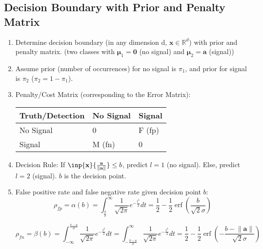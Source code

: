 \documentclass[11pt]{article}
\newcommand{\R}{\mathbb{R}}
\newcommand{\norm}[1]{\left\lVert#1\right\rVert}
\DeclareMathOperator{\erf}{erf}
\begin{document}
\subsection{Decision Boundary with Prior and Penalty Matrix}

\begin{enumerate}
    \item Determine decision boundary (in any dimension d, $\mathbf{x} \in \R^d$) with prior and penalty matrix. (two classes with $\mathbf{\mu}_1 = \mathbf{0}$ (no signal) and $\mathbf{\mu}_2 = \mathbf{a}$ (signal))
    \item Assume prior (number of occurrences) for no signal is $\pi_1$, and prior for signal is $\pi_2$ ($\pi_2 = 1-\pi_1$). 
    \item Penalty/Cost Matrix (corresponding to the Error Matrix):
    
    \begin{tabular}{l|l|l}
    Truth/Detection&No Signal&Signal\\\hline
    No Signal&0&F (fp)\\\hline
    Signal&M (fn)&0\\
    \end{tabular}
    \item Decision Rule: If $\inp {\mathbf{x}} {\frac{\mathbf{a} }{\norm {\mathbf{a} }}} \le b$, predict $l=1$ (no signal). Else, predict $l=2$ (signal). $b$ is the decision point.
    \item False positive rate and false negative rate given decision point $b$:
    \begin{equation}
        \rho_{fp} = \alpha(b) = \int_{\frac{b}{\sigma}}^{\infty} \frac{1}{\sqrt{2\pi}} e^{-\frac{t^2}{2}}dt = \frac{1}{2} - \frac{1}{2} \erf(\frac{b}{\sqrt{2}\sigma})
    \end{equation}
    
    \begin{equation}
        \rho_{fn}= \beta(b) = \int_{-\infty}^{\frac{b-a}{\sigma}} \frac{1}{\sqrt{2\pi}} e^{-\frac{t^2}{2}}dt = \int_{-\frac{b-a}{\sigma}}^{\infty} \frac{1}{\sqrt{2\pi}} e^{-\frac{t^2}{2}}dt = \frac{1}{2} - \frac{1}{2} \erf(-\frac{b-\norm {\mathbf{a} }}{\sqrt{2}\sigma})
    \end{equation}
    

\end{enumerate}
\end{document}
